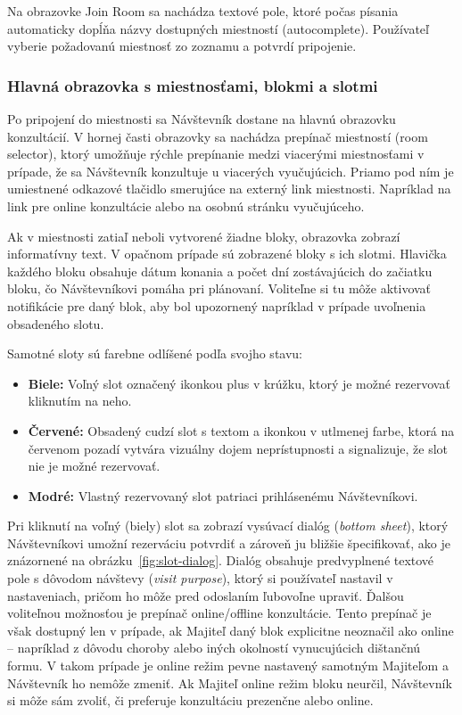 Na obrazovke Join Room sa nachádza textové pole, ktoré počas písania automaticky dopĺňa názvy dostupných miestností (autocomplete). Používateľ vyberie požadovanú miestnosť zo zoznamu a potvrdí pripojenie.

\subsubsection*{Hlavná obrazovka s miestnosťami, blokmi a slotmi}
Po pripojení do miestnosti sa Návštevník dostane na hlavnú obrazovku konzultácií. V hornej časti obrazovky sa nachádza prepínač miestností (room selector), ktorý umožňuje rýchle prepínanie medzi viacerými miestnosťami v prípade, že sa Návštevník konzultuje u viacerých vyučujúcich. Priamo pod ním je umiestnené odkazové tlačidlo smerujúce na externý link miestnosti. Napríklad na link pre online konzultácie alebo na osobnú stránku vyučujúceho.

Ak v miestnosti zatiaľ neboli vytvorené žiadne bloky, obrazovka zobrazí informatívny text. V opačnom prípade sú zobrazené bloky s ich slotmi. Hlavička každého bloku obsahuje dátum konania a počet dní zostávajúcich do začiatku bloku, čo Návštevníkovi pomáha pri plánovaní. Voliteľne si tu môže aktivovať notifikácie pre daný blok, aby bol upozornený napríklad v prípade uvoľnenia obsadeného slotu.

Samotné sloty sú farebne odlíšené podľa svojho stavu:
\begin{itemize}
    \item \textbf{Biele:} Voľný slot označený ikonkou plus v krúžku, ktorý je možné rezervovať kliknutím na neho.
    \item \textbf{Červené:} Obsadený cudzí slot s textom a ikonkou v utlmenej farbe, ktorá na červenom pozadí vytvára vizuálny dojem neprístupnosti a signalizuje, že slot nie je možné rezervovať.
    \item \textbf{Modré:} Vlastný rezervovaný slot patriaci prihlásenému Návštevníkovi.
\end{itemize}

Pri kliknutí na voľný (biely) slot sa zobrazí vysúvací dialóg (\textit{bottom sheet}), ktorý Návštevníkovi umožní rezerváciu potvrdiť a zároveň ju bližšie špecifikovať, ako je znázornené na obrázku~\ref{fig:slot-dialog}. Dialóg obsahuje predvyplnené textové pole s dôvodom návštevy (\textit{visit purpose}), ktorý si používateľ nastavil v nastaveniach, pričom ho môže pred odoslaním ľubovoľne upraviť. Ďalšou voliteľnou možnosťou je prepínač online/offline konzultácie. Tento prepínač je však dostupný len v prípade, ak Majiteľ daný blok explicitne neoznačil ako online – napríklad z dôvodu choroby alebo iných okolností vynucujúcich dištančnú formu. V takom prípade je online režim pevne nastavený samotným Majiteľom a Návštevník ho nemôže zmeniť. Ak Majiteľ online režim bloku neurčil, Návštevník si môže sám zvoliť, či preferuje konzultáciu prezenčne alebo online.

